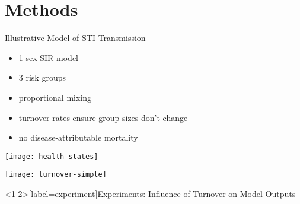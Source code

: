 \documentclass[11pt,aspectratio=169]{beamer}
\begin{document}
\section{Methods}
\begin{frame}{Illustrative Model of STI Transmission}
  \begin{minipage}{0.62\linewidth}
    \begin{itemize}
      \item 1-sex SIR model
      \item 3 risk groups
      \item proportional mixing
      \item turnover rates ensure group sizes don't change
      \item no disease-attributable mortality
    \end{itemize}
    \vspace{1em}
    \texttt{[image: health-states]}
  \end{minipage}%
  \begin{minipage}{0.38\linewidth}
    \texttt{[image: turnover-simple]}
  \end{minipage}
\end{frame}
\begin{frame}<1-2>[label=experiment]{Experiments: Influence of Turnover on Model Outputs}
  \begin{enumerate}
    \vspace{1em}
  \end{enumerate}
\end{frame}
\end{document}
